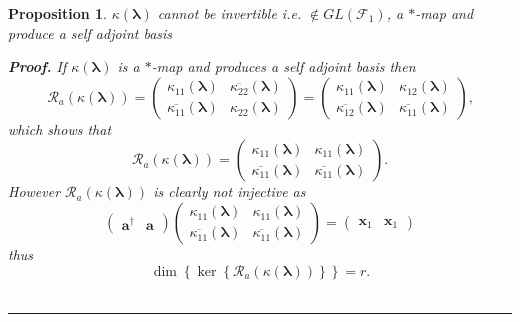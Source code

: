 \documentclass[aps, preprint]{revtex4}
\newtheorem{proposition}[theorem]{Proposition}
\newenvironment{proof}[1][Proof]{\noindent\textbf{#1.} }{\ \rule{0.5em}{0.5em}}
\begin{document}
\begin{proposition}
$\kappa  \left (\mathbf{\lambda }\right )$ cannot be invertible i.e. $ \notin G L \left (\mathcal{F}_{1}\right )$, a $ \ast $-map and produce a self adjoint basis 


\begin{proof}
If $\kappa  \left (\mathbf{\lambda }\right )$ is a $ \ast $-map and produces a self adjoint basis then
\begin{equation}\mathcal{R}_{a} \left (\kappa  \left (\mathbf{\lambda }\right )\right ) =\left (\begin{array}{cc}\kappa _{1 1} \left (\mathbf{\lambda }\right ) & \overline{\kappa _{2 2}} \left (\mathbf{\lambda }\right ) \\
\overline{\kappa _{1 1}} \left (\mathbf{\lambda }\right ) & \kappa _{2 2} \left (\mathbf{\lambda }\right )\end{array}\right ) =\left (\begin{array}{cc}\kappa _{1 1} \left (\mathbf{\lambda }\right ) & \kappa _{1 2} \left (\mathbf{\lambda }\right ) \\
\overline{\kappa _{1 2}} \left (\mathbf{\lambda }\right ) & \overline{\kappa _{1 1}} \left (\mathbf{\lambda }\right )\end{array}\right )\text{,}
\end{equation}which shows that
\begin{equation}\mathcal{R}_{a} \left (\kappa  \left (\mathbf{\lambda }\right )\right ) =\left (\begin{array}{cc}\kappa _{1 1} \left (\mathbf{\lambda }\right ) & \kappa _{1 1} \left (\mathbf{\lambda }\right ) \\
\overline{\kappa _{1 1}} \left (\mathbf{\lambda }\right ) & \overline{\kappa _{1 1}} \left (\mathbf{\lambda }\right )\end{array}\right )\text{.}
\end{equation}However $\mathcal{R}_{a} \left (\kappa  \left (\mathbf{\lambda }\right )\right )$ is clearly not injective as
\begin{equation}\left (\begin{array}{cc}\mathbf{a}^{ \dag } & \mathbf{a}\end{array}\right ) \left (\begin{array}{cc}\kappa _{1 1} \left (\mathbf{\lambda }\right ) & \kappa _{1 1} \left (\mathbf{\lambda }\right ) \\
\overline{\kappa _{1 1}} \left (\mathbf{\lambda }\right ) & \overline{\kappa _{1 1}} \left (\mathbf{\lambda }\right )\end{array}\right ) =\left (\begin{array}{cc}\mathbf{x}_{1} & \mathbf{x}_{1}\end{array}\right )
\end{equation}thus
\begin{equation}\dim  \left \{\ker  \left \{\mathcal{R}_{a} \left (\kappa  \left (\mathbf{\lambda }\right )\right )\right \}\right \} =r\text{.}
\end{equation}
\end{proof}


\end{proposition}
\end{document}
